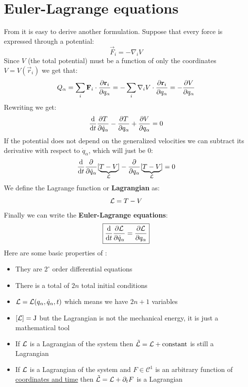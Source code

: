 \section{Euler-Lagrange equations}
From \lagrangeref\;it is easy to derive another formulation. Suppose that every force is expressed through a potential:
\begin{equation}
    \vec{F}_i = -\nabla_i V
\end{equation}
Since $V$ (the total potential) must be a function of only the coordinates $V = V(\vec{r}_i)$ we get that:
\begin{equation}
    Q_{\alpha} = \bigsum_i \vec{F}_i \cdot \pdv{ \vec{r}_i}{ q_{\alpha}} = - \bigsum_i \nabla_i V \cdot \pdv{ \vec{r}_i}{ q_{\alpha}} = -\pdv{V}{q_{\alpha}}
\end{equation}
Rewriting \lagrangeref\;we get:
\begin{equation}
    \dv{}{t}\pdv{ T}{ \dot{q}_{\alpha}} - \pdv{ T}{ q_{\alpha}} + \pdv{V}{q_{\alpha}} = 0
\end{equation}
If the potential does not depend on the generalized velocities we can subtract its derivative with respect to $\dot{q}_{\alpha}$, which will just be 0:
\begin{equation}
    \dv{}{t}\pdv{ }{ \dot{q}_{\alpha}}[\underbrace{T-V}_\lagr ] - \pdv{}{ q_{\alpha}}[\underbrace{T-V}_\lagr ] = 0
\end{equation}
We define the Lagrange function or \textbf{Lagrangian} as:
\begin{equation}
    \mathcal{L}  = T - V
\end{equation}
Finally we can write the \textbf{Euler-Lagrange equations}:
\begin{equation} \label{Euler_Lagrange_equations}
    \boxed{\dv{}{t}\pdv{\lagr}{\dot{q}_{\alpha}} = \pdv{\lagr}{q_{\alpha}}}
\end{equation}
Here are some basic properties of \eleref :
\begin{itemize}
    \item They are $2^\circ$ order differential equations
    \item There is a total of $2n$ total initial conditions
    \item $\mathcal{L} = \mathcal{L}(q_{\alpha},\dot{q}_{\alpha},t)$ which means we have $2n+1$ variables
    \item $[\mathcal{L}] = \mathrm{J}$ but the Lagrangian is not the mechanical energy, it is just a mathematical tool
    \item If $\mathcal{L}$ is a Lagrangian of the system then $\tilde{\mathcal{L}} = \mathcal{L} + \mathrm{constant}$ is still a Lagrangian
    \item If $\mathcal{L}$ is a Lagrangian of the system and $F\in \mathcal{C}^1$ is an arbitrary function of \underline{coordinates and time} then $\tilde{\mathcal{L}} = \mathcal{L} + \partial_t F$ is a Lagrangian
\end{itemize}
